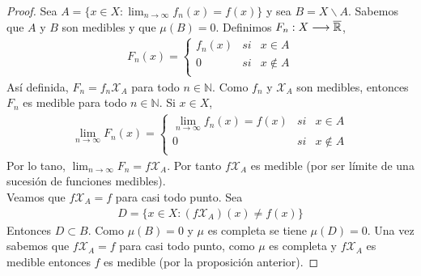 \begin{proof}
Sea $A = \{ x \in X : \lim_{n \to \infty}{f_n(x)} = f(x)\}$ y sea $B = X \backslash A$. Sabemos que $A$ y $B$ son medibles y que $\mu(B) = 0$. Definimos $F_n: X \longrightarrow \overline{\mathbb{R}}$,
\begin{align*}
    F_n(x) = \left\{ \begin{array}{lcc}
             f_n(x) &  si  &x \in A\\
             0 &  si  &x \not \in  A \\
             \end{array}
        \right.
\end{align*}
Así definida, $F_n = f_n \mathcal{X}_A$ para todo $n \in \mathbb{N}$. Como $f_n$ y $\mathcal{X}_A$ son medibles, entonces $F_n$ es medible para todo $n \in \mathbb{N}$. Si $x \in X$,
\begin{align*}
    \lim_{n \to \infty}{F_n(x)} = \left\{ \begin{array}{lcc}
             \lim_{n \to \infty}{f_n(x)} = f(x) &  si  &x \in A\\
             0 &  si  &x \not \in  A \\
             \end{array}
        \right.
\end{align*}
Por lo tano, $\lim_{n \to \infty}{F_n} = f \mathcal{X}_A$. Por tanto $f \mathcal{X}_A$ es medible (por ser límite de una sucesión de funciones medibles).
\\
\newline
Veamos que $f \mathcal{X}_A = f$ para casi todo punto. Sea
\begin{align*}
    D = \{ x \in X : (f \mathcal{X}_A)(x) \not = f(x) \}
\end{align*}
Entonces $D \subset B$. Como $\mu(B) = 0$ y $\mu$ es completa se tiene $\mu(D) = 0$. Una vez sabemos que $f \mathcal{X}_A = f$ para casi todo punto, como $\mu$ es completa y $f \mathcal{X}_A$ es medible entonces $f$ es medible (por la proposición anterior).
\end{proof}